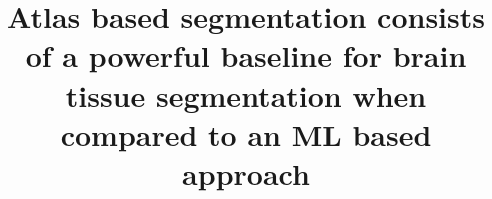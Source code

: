 \documentclass[conference]{IEEEtran}
\begin{document}
\title{Atlas based segmentation consists of a powerful baseline for brain tissue segmentation when compared to an ML based approach}

\author{
\and
{}
\and
{}
}

\maketitle

\begin{abstract}

\end{abstract}







\end{document}
